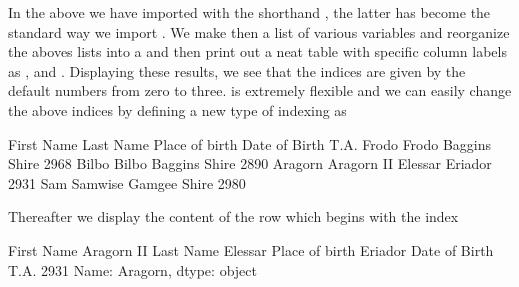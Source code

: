 \documentclass[letterpaper,10pt,english]{sphinxmanual}
\begin{document}
In the above we have imported  with the shorthand , the latter has become the standard way we import . We make then a list of various variables
and reorganize the aboves lists into a  and then print out  a neat table with specific column labels as ,  and .
Displaying these results, we see that the indices are given by the default numbers from zero to three.
 is extremely flexible and we can easily change the above indices by defining a new type of indexing as

\begin{sphinxVerbatim}[commandchars=\\\{\}]
  \PYG{p}{[}\PYG{p}{]}
\end{sphinxVerbatim}

\begin{sphinxVerbatim}[commandchars=\\\{\}]
         First Name Last Name Place of birth  Date of Birth T.A.
Frodo         Frodo   Baggins          Shire                2968
Bilbo         Bilbo   Baggins          Shire                2890
Aragorn  Aragorn II   Elessar        Eriador                2931
Sam         Samwise    Gamgee          Shire                2980
\end{sphinxVerbatim}

Thereafter we display the content of the row which begins with the index 

\begin{sphinxVerbatim}[commandchars=\\\{\}]
\PYG{p}{[}\PYG{p}{]}
\end{sphinxVerbatim}

\begin{sphinxVerbatim}[commandchars=\\\{\}]
First Name            Aragorn II
Last Name                Elessar
Place of birth           Eriador
Date of Birth T.A.          2931
Name: Aragorn, dtype: object
\end{sphinxVerbatim}
\end{document}

